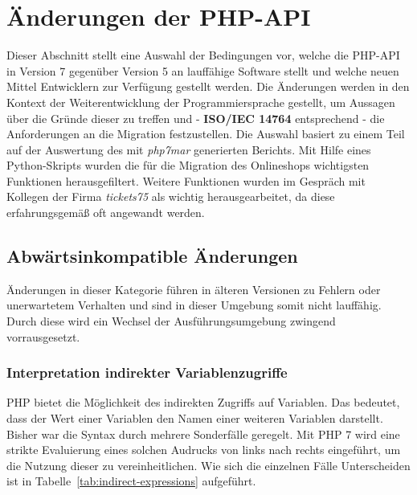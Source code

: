 \chapter{Änderungen der PHP-API}\label{ch:php7}
Dieser Abschnitt stellt eine Auswahl der Bedingungen vor, welche die \acs{PHP}-\acs{API} in Version 7 gegenüber Version 5 an lauffähige Software stellt und welche 
neuen Mittel Entwicklern zur Verfügung gestellt werden. Die Änderungen werden in den Kontext der Weiterentwicklung der Programmiersprache gestellt, um Aussagen 
über die Gründe dieser zu treffen und - \textbf{ISO/IEC 14764} entsprechend - die Anforderungen an die Migration festzustellen.
Die Auswahl basiert zu einem Teil auf der Auswertung des mit \textit{php7mar} generierten Berichts. Mit Hilfe eines Python-Skripts 
wurden die für die Migration des Onlineshops wichtigsten Funktionen herausgefiltert. Weitere Funktionen wurden im 
Gespräch mit Kollegen der Firma \textit{tickets75} als wichtig herausgearbeitet, da diese erfahrungsgemäß oft angewandt werden.

\section{Abwärtsinkompatible Änderungen}
Änderungen in dieser Kategorie führen in älteren Versionen zu Fehlern oder unerwartetem Verhalten und sind in dieser Umgebung somit nicht lauffähig. Durch diese wird ein 
Wechsel der Ausführungsumgebung zwingend vorrausgesetzt.

    \subsection{Interpretation indirekter Variablenzugriffe}\label{indirectVar}
    \acs{PHP} bietet die Möglichkeit des indirekten Zugriffs auf Variablen. Das bedeutet, dass der Wert einer Variablen den Namen einer weiteren Variablen darstellt.
    Bisher war die Syntax durch mehrere Sonderfälle geregelt. Mit \acs{PHP} 7 wird eine strikte Evaluierung eines solchen Audrucks von links nach rechts eingeführt, 
    um die Nutzung dieser zu vereinheitlichen. Wie sich die einzelnen Fälle Unterscheiden ist in Tabelle~\ref{tab:indirect-expressions} aufgeführt.

